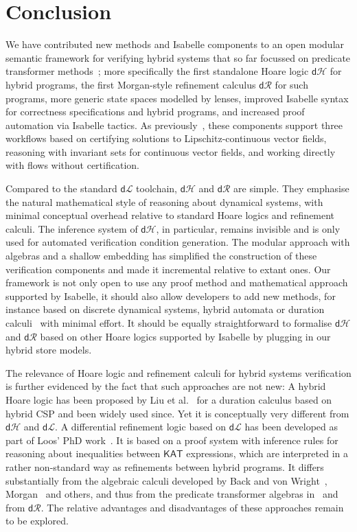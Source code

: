 \documentclass[envcountsame,envcountsect]{llncs}
\newcommand{\KAT}{\mathsf{KAT}}
\newcommand{\dL}{\mathsf{d}\mathcal{L}}
\newcommand{\dH}{\mathsf{d}\mathcal{H}}
\newcommand{\dR}{\mathsf{d}\mathcal{R}}
\begin{document}

\section{Conclusion}\label{sec:conclusion}

We have contributed new methods and Isabelle components to an open
modular semantic framework for verifying hybrid systems that so far
focussed on predicate transformer methods~\cite{MuniveS19}; more
specifically the first standalone Hoare logic $\dH$ for hybrid
programs, the first Morgan-style refinement calculus $\dR$ for such
programs, more generic state spaces modelled by lenses, improved
Isabelle syntax for correctness specifications and hybrid programs,
and increased proof automation via Isabelle tactics.  As
previously~\cite{MuniveS19}, these components support three workflows
based on certifying solutions to Lipschitz-continuous vector fields,
reasoning with invariant sets for continuous vector fields, and
working directly with flows without certification.

Compared to the standard $\dL$ toolchain, $\dH$ and $\dR$ are
simple. They emphasise the natural mathematical style of reasoning
about dynamical systems, with minimal conceptual overhead relative to
standard Hoare logics and refinement calculi. The inference system of
$\dH$, in particular, remains invisible and is only used for automated
verification condition generation. The modular approach with algebras
and a shallow embedding has simplified the construction of these
verification components and made it incremental relative to extant
ones. Our framework is not only open to use any proof method and
mathematical approach supported by Isabelle, it should also allow
developers to add new methods, for instance based on discrete
dynamical systems, hybrid automata or duration
calculi~\cite{LiuLQZZZZ10} with minimal effort. It should be equally
straightforward to formalise $\dH$ and $\dR$ based on other Hoare
logics supported by Isabelle by plugging in our hybrid store models.

The relevance of Hoare logic and refinement calculi for hybrid systems
verification is further evidenced by the fact that such approaches are
not new: A hybrid Hoare logic has been proposed by Liu et
al.~\cite{LiuLQZZZZ10} for a duration calculus based on hybrid CSP and
been widely used since. Yet it is conceptually very different from
$\dH$ and $\dL$. A differential refinement logic based on $\dL$ has
been developed as part of Loos' PhD work~\cite{LoosP16}.  It is based
on a proof system with inference rules for reasoning about
inequalities between $\KAT$ expressions, which are interpreted in a
rather non-standard way as refinements between hybrid programs. It
differs substantially from the algebraic calculi developed by Back and
von Wright~\cite{BackW98}, Morgan~\cite{Morgan94} and others, and thus
from the predicate transformer algebras in~\cite{MuniveS19} and from
$\dR$.  The relative advantages and disadvantages of these approaches
remain to be explored.
\end{document}
